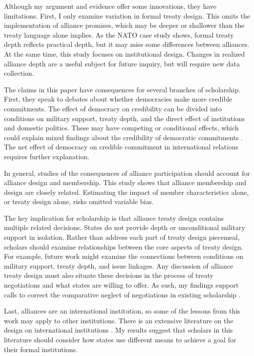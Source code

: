 \documentclass[12pt]{article}
\begin{document}
Although my argument and evidence offer some innovations, they have limitations. 
First, I only examine variation in formal treaty design. 
This omits the implementation of alliance promises, which may be deeper or shallower than the treaty language alone implies. 
As the NATO case study shows, formal treaty depth reflects practical depth, but it may miss some differences between alliances. 
At the same time, this study focuses on institutional design. 
Changes in realized alliance depth are a useful subject for future inquiry, but will require new data collection. 


The claims in this paper have consequences for several branches of scholarship. 
First, they speak to debates about whether democracies make more credible commitments. 
The effect of democracy on credibility can be divided into conditions on military support, treaty depth, and the direct effect of institutions and domestic politics. 
These may have competing or conditional effects, which could explain mixed findings about the credibility of democratic commitments \citep{Schultz1999, Leeds1999, Thyne2012, DownesSechser2012}.
The net effect of democracy on credible commitment in international relations requires further explanation. 


In general, studies of the consequences of alliance participation should account for alliance design and membership. 
This study shows that alliance membership and design are closely related. 
Estimating the impact of member characteristics alone, or treaty design alone, risks omitted variable bias. 


The key implication for scholarship is that alliance treaty design contains multiple related decisions. 
States do not provide depth or unconditional military support in isolation. 
Rather than address each part of treaty design piecemeal, scholars should examine relationships between the core aspects of treaty design. 
For example, future work might examine the connections between conditions on military support, treaty depth, and issue linkages.  
Any discussion of alliance treaty design must also situate these decisions in the process of treaty negotiations and what states are willing to offer.
As such, my findings support calls to correct the comparative neglect of negotiations in existing scholarship \citep{Poast2019a}. 


Last, alliances are an international institution, so some of the lessons from this work may apply to other institutions. 
There is an extensive literature on the design on international institutions \citep{DownesRocke1995, MartinSimmons1998, Koremenosetal2001, Koremenos2005, Thompson2010}.
My results suggest that scholars in this literature should consider how states use different means to achieve a goal for their formal institutions. 
\end{document}
